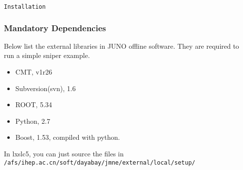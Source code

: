 \begin{frame}
    \begin{center}
        \LARGE \tt{Installation}
    \end{center}
\end{frame}

\begin{frame}
    \frametitle{Mandatory Dependencies}
    Below list the external libraries in JUNO offline software.
    They are required to run a simple sniper example.
    \begin{itemize}
        \item CMT, v1r26
        \item Subversion(svn), 1.6
        \item ROOT, 5.34
        \item Python, 2.7
        \item Boost, 1.53, compiled with python.
    \end{itemize}
    In lxslc5, you can just source the files in
    {\tt /afs/ihep.ac.cn/soft/dayabay/jmne/external/local/setup/}
\end{frame}
